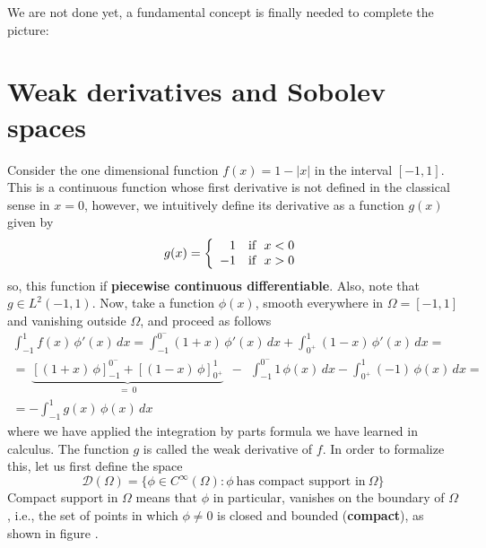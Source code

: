 We are not done yet, a fundamental concept is finally needed to complete
the picture:

\section{Weak derivatives and Sobolev spaces}  

Consider the one dimensional function $f(x) = 1 - \lvert x \rvert$ in the
interval $[-1,1]$. This is a continuous function whose first derivative
is not defined in the classical sense in $x = 0$, however, we intuitively
define its derivative as a function $g(x)$ given by
\begin{equation}
g(x) = \left\{
\begin{array}{rc}
1 & \mbox{if}~~x < 0 \\
-1 & \mbox{if}~~x > 0 \\
\end{array}
\right. \labeq{fprimexample}
\end{equation}
so, this function if \textbf{piecewise continuous differentiable}.
Also, note that $g\in L^{2}(-1,1)$.
Now, take a function $\phi(x)$, smooth
everywhere in $\Omega = [-1,1]$ and vanishing outside
$\Omega$, and proceed as follows
\begin{eqnarray}
\int_{-1}^{1}{f(x) \, \phi'(x)}\,dx = \int_{-1}^{0^-}{(1+x) \, \phi'(x)}\,dx + \int_{0^+}^{1}{(1-x) \, \phi'(x)}\,dx =
~~~~~~~~~&\nonumber \\
=~\underbrace{[(1+x)\,\phi]_{-1}^{0^-} + [(1-x)\,\phi]_{0^+}^{1}}_{=~0}
~~-~~ \int_{-1}^{0^-}{1 \, \phi(x)}\,dx - \int_{0^+}^{1}{(-1) \, \phi(x)}\,dx =  \nonumber \\
= -\int_{-1}^{1}{g(x) \, \phi(x)}\,dx~~~ &
\end{eqnarray}
where we have applied the integration by parts formula we have learned in calculus.
The function $g$ is called the weak derivative of $f$.
In order to formalize this, let us first define the space
\begin{equation}
\mathcal{D}(\Omega) = \{\phi \in C^{\infty}(\Omega) : \phi~\mbox{has compact support in}~\Omega \}
\end{equation}
Compact support in $\Omega$ means that $\phi$ in particular, vanishes on the boundary of ${\Omega}$,
i.e., the set of points in which $\phi\ne 0$ is closed and bounded (\textbf{compact}),
as shown in figure .

